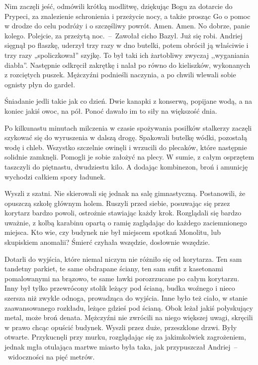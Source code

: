 \documentclass[../MAIN.tex]{subfiles}
\begin{document}
Nim zaczęli jeść, odmówili krótką modlitwę, dziękując Bogu za dotarcie do Prypeci, za znalezienie schronienia i przeżycie nocy, a także prosząc Go o pomoc w drodze do celu podróży i o szczęśliwy powrót.
\sx Amen.
\xx Amen.
\xx No dobrze, panie kolego. Polejcie, za przeżytą noc.~--~Zawołał cicho Bazyl.
\xx Już się robi.
\qd
Andriej sięgnął po flaszkę, uderzył trzy razy w dno butelki,
potem obrócił ją właściwie i trzy razy „spoliczkował” szyjkę.
To był taki ich żartobliwy zwyczaj ,,wyganiania diabła''.
Następnie odkręcił zakrętkę i nalał po równo do kieliszków,
wykonanych z rozciętych puszek. Mężczyźni podnieśli naczynia, a
po chwili wlewali sobie ognisty płyn do gardeł.

Śniadanie jedli takie jak co dzień. Dwie kanapki z konserwą, popijane wodą, a na koniec jakiś owoc, na pół. Ponoć dawało im to siły na większość dnia.

Po kilkunastu minutach milczenia w czasie spożywania posiłków
stalkerzy zaczęli szykować się do wyruszenia w dalszą drogę.
Spakowali butelkę wódki, pozostałą wodę i chleb. Wszystko
szczelnie owinęli i wrzucili do plecaków, które następnie
solidnie zamknęli. Pomogli je sobie założyć na plecy. W sumie,
z całym osprzętem taszczyli do piętnastu, dwudziestu kilo. A
dodając 	kombinezon, broń i amunicję wychodzi całkiem
spory ładunek.

Wyszli z szatni. Nie skierowali się jednak na salę gimnastyczną. Postanowili, że opuszczą szkołę głównym holem. Ruszyli przed siebie, posuwając się przez korytarz bardzo powoli, ostrożnie stawiając każdy krok. Rozglądali się bardzo uważnie, z kolbą karabinu opartą o ramię zaglądając do każdego zaciemnionego miejsca. Kto wie, czy budynek nie był miejscem spotkań Monolitu, lub skupiskiem anomalii? Śmierć czyhała wszędzie, dosłownie wszędzie.

Dotarli do wyjścia, które niemal niczym nie różniło się od korytarza. Ten sam tandetny parkiet, te same obdrapane ściany, ten sam sufit z kasetonami pomalowanymi na brązowo, te same ławki porozrzucane po całym korytarzu. Inny był tylko przewrócony stolik leżący pod ścianą, budka woźnego i nieco szersza niż zwykle odnoga, prowadząca do wyjścia. Inne było też ciało, w stanie zaawansowanego rozkładu, leżące gdzieś pod ścianą. Obok leżał jakiś połyskujący metal, może broń denata. Mężczyźni nie zwrócili na niego większej uwagi, skręcili w prawo chcąc opuścić budynek. Wyszli przez duże, przeszklone drzwi. Były otwarte. Przykucnęli przy murku, rozglądając się za jakimkolwiek zagrożeniem, jednak mgła otulająca martwe miasto była taka, jak przypuszczał Andriej~--~widoczności na pięć metrów.
\end{document}
